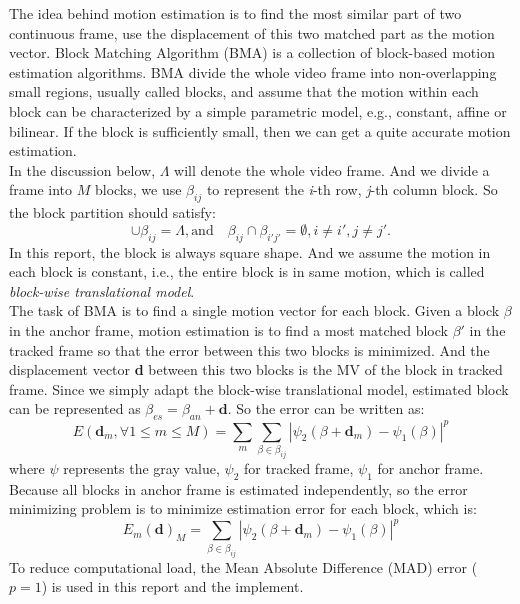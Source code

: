\documentclass[a4paper, twocolumn]{article}
\begin{document}
	\noindent	
	The idea behind motion estimation is to find the most similar part of two continuous frame, use the displacement of this two matched part as the motion vector.  Block Matching Algorithm (BMA) is a collection of block-based motion estimation algorithms.  BMA divide the whole video frame into non-overlapping small regions, usually called blocks, and assume that the motion within each block can be characterized by a simple parametric model, e.g., constant, affine or bilinear. If the block is sufficiently small, then we can get a quite accurate motion estimation. \\
	In the discussion below, $\Lambda$ will denote the whole video frame. And we divide a frame into $ M $ blocks, we use $ \beta_{ij} $ to represent the \textit{i}-th row, \textit{j}-th column block. So the block partition should satisfy: 
	\begin{displaymath}
		\cup  \beta_{ij} = \Lambda, \textrm{and} \quad \beta_{ij}  \cap \beta_{i'j'} = \emptyset, i \ne i', j \ne j' .
	\end{displaymath}
	In this report, the block is always square shape. And we assume the motion in each block is constant, i.e., the entire block is in same motion, which is called \textit{block-wise translational model}. \\
	The task of BMA is to find a single motion vector for each block. Given a block $ \beta $ in the anchor frame, motion estimation is to find a most matched block $ \beta' $ in the tracked frame so that the error between this two blocks is minimized. And the displacement vector \textbf{d} between this two blocks is the MV of the block in tracked frame. Since we simply adapt the block-wise translational model, estimated block can be represented as $ \beta_{es} = \beta_{an} + \textbf{d} $. So the error can be written as: 
	\begin{displaymath}
		\textit{E}(\textbf{d}_{m}, \forall 1 \leq m \leq M) = \sum_{m} \sum_{\beta \in \beta_{ij}} 
		| \psi_{2}(\beta + \textbf{d}_{m}) - \psi_{1}(\beta) | ^ {p}
	\end{displaymath}
	where $ \psi $ represents the gray value, $ \psi_{2} $ for tracked frame, $ \psi_{1} $ for anchor frame.\\
	Because all blocks in anchor frame is estimated independently, so the error minimizing problem is to minimize estimation error for each block, which is: 
	\begin{displaymath}
		\textit{E}_{m}(\textbf{d})_{M} = \sum_{\beta \in \beta_{ij}} | \psi_{2}(\beta + \textbf{d}_{m}) - \psi_{1}(\beta) | ^{p}
	\end{displaymath}
	To reduce computational load, the Mean Absolute Difference (MAD) error ( $ p = 1 $) is used in this report and the implement.
\end{document}
